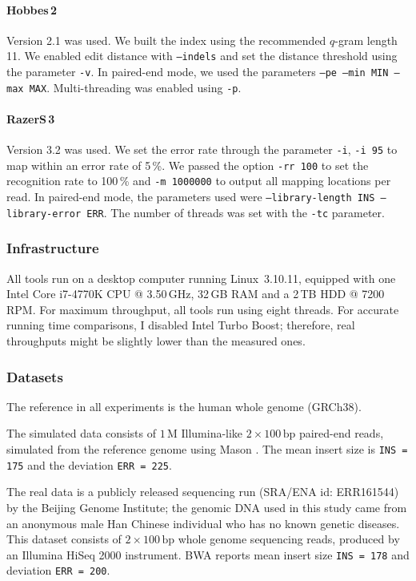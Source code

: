 \paragraph{Hobbes\,2}
Version 2.1 was used.
We built the index using the recommended $q$-gram length 11.
We enabled edit distance with \texttt{--indels} and set the distance threshold using the parameter \texttt{-v}.
In paired-end mode, we used the parameters \texttt{--pe --min MIN --max MAX}.
Multi-threading was enabled using \texttt{-p}.

\paragraph{RazerS\,3}
Version 3.2 was used.
We set the error rate through the parameter \texttt{-i}, \eg \texttt{-i 95} to map within an error rate of 5\,\%.
We passed the option \texttt{-rr 100} to set the recognition rate to 100\,\% and \texttt{-m 1000000} to output all mapping locations per read.
In paired-end mode, the parameters used were \texttt{--library-length INS --library-error ERR}.
The number of threads was set with the \texttt{-tc} parameter.

\subsubsection{Infrastructure}

All tools run on a desktop computer running Linux~3.10.11, equipped with one Intel Core i7-4770K CPU @ 3.50\,GHz, 32\,GB RAM and a 2\,TB HDD @ 7200\,RPM.
For maximum throughput, all tools run using eight threads.
For accurate running time comparisons, I disabled Intel Turbo Boost; therefore, real throughputs might be slightly lower than the measured ones.

\subsubsection{Datasets}

The reference in all experiments is the human whole genome (GRCh38).

The simulated data consists of $1\,\text{M}$ Illumina-like $2 \times 100\,\text{bp}$ paired-end reads, simulated from the reference genome using Mason \citep{SeqAnReadSimulator}.
The mean insert size is \texttt{INS = 175} and the deviation \texttt{ERR = 225}.

The real data is a publicly released sequencing run (SRA/ENA id: ERR161544) by the Beijing Genome Institute;
the genomic DNA used in this study came from an anonymous male Han Chinese individual who has no known genetic diseases.
This dataset consists of $2 \times 100\,\text{bp}$ whole genome sequencing reads, produced by an Illumina HiSeq 2000 instrument.
BWA reports mean insert size \texttt{INS = 178} and deviation \texttt{ERR = 200}.

